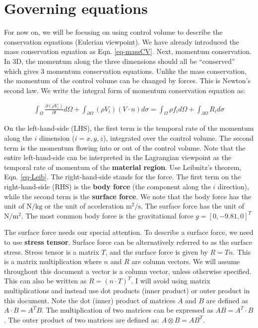 \documentclass[11pt, letterpaper]{report}
\begin{document}
\section{Governing equations}

For now on, we will be focusing on using control volume to describe the conservation equations
(Eulerian viewpoint). We have already introduced the mass conservation equation as Eqn.
\ref{eq-massCV}. Next, momentum conservation. In 3D, the momentum along the three dimensions should
all be ``conserved'' which gives 3 momentum conservation equations. Unlike the mass conservation,
the momentum of the control volume can be changed by forces. This is Newton's second law. We write
the integral form of momentum conservation equation as:


\begin{align}\label{eq-mom}
   \int_\Omega \frac{\partial(\rho V_i)}{\partial t}d\Omega + \int_{\partial\Omega}(\rho
   V_i)(V\cdot n)d\sigma = \int_\Omega \rho f_i d\Omega + \int_{\partial\Omega}R_i d\sigma
\end{align}

On the left-hand-side (LHS), the first term is the temporal rate of the momentum along the $i$ dimension
($i = x, y, z$), integrated over the control volume.  The second term is the momentum flowing into
or out of the control volume. Note that the entire left-hand-side can be interpreted in the
Lagrangian viewpoint as the temporal rate of momentum of the {\bf material region}. Use Leibnitz's
theorem, Eqn. \ref{eq-Leib}. The right-hand-side stands for the force. The first term on the
right-hand-side (RHS) is the {\bf body force} (the component along the $i$ direction), while the second
term is the {\bf surface force}. We note that the body force has the unit of $\textrm{N/kg}$ or the
unit of acceleration $\mathrm{m^2/s}$. The surface force has the unit of $\mathrm{N/m^2}$. The most
common body force is the gravitational force $g = [0, -9.81, 0]^T$
\paraspace

The surface force needs our special attention. To describe a surface force, we need to use {\bf
stress tensor}. Surface force can be alternatively referred to as the surface stress. Stress tensor
is a matrix $T$, and the surface force is given by $R = Tn$. This is a matrix multiplication where
$n$ and $R$ are column vectors. We will assume throughout this document a vector is a column vector,
unless otherwise specified. This can also be written as $R = (n\cdot T)^T$. I will avoid using
matrix multiplications and instead use dot products (inner product) or outer product in this
document. Note the dot (inner) product of matrices $A$ and $B$ are defined as $A \cdot B = A^T B$.
The multiplication of two matrices can be expressed as $AB = A^T \cdot B$. The outer product of two
matrices are defined as: $A\mathop{\otimes}B = AB^T$. \paraspace
\end{document}
